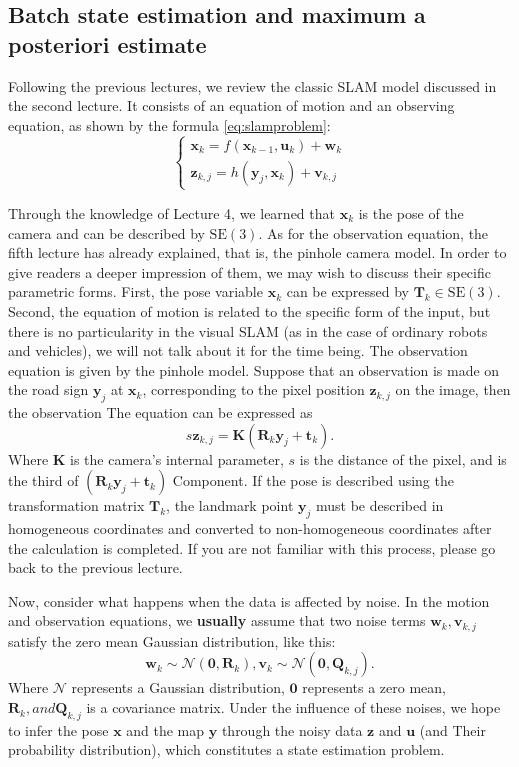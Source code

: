 \subsection{Batch state estimation and maximum a posteriori estimate}
Following the previous lectures, we review the classic SLAM model discussed in the second lecture. It consists of an equation of motion and an observing equation, as shown by the formula \eqref{eq:slamproblem}:
\begin{equation}
\left\{ \begin{array}{l}
{\bm{x}_k} = f\left( {{\bm{x}_{k - 1}},{\bm{u}_k}} \right) + \bm{w}_k\\
{\bm{z}_{k,j}} = h\left( {{ \bm{y}_j},{ \bm{x}_k}} \right)+ \bm{v}_{k, j}
\end{array} \right.
\end{equation}

Through the knowledge of Lecture 4, we learned that $\bm{x}_k$ is the pose of the camera and can be described by $\mathrm{SE}(3)$. As for the observation equation, the fifth lecture has already explained, that is, the pinhole camera model. In order to give readers a deeper impression of them, we may wish to discuss their specific parametric forms. First, the pose variable $\bm{x}_k$ can be expressed by $\bm{T}_k \in \mathrm{SE}(3) $. Second, the equation of motion is related to the specific form of the input, but there is no particularity in the visual SLAM (as in the case of ordinary robots and vehicles), we will not talk about it for the time being. The observation equation is given by the pinhole model. Suppose that an observation is made on the road sign $\bm{y}_j$ at $\bm{x}_k$, corresponding to the pixel position $\bm{z}_{k,j}$ on the image, then the observation The equation can be expressed as
\begin{equation}
s \bm{z}_{k,j}= \bm{K} (\bm{R}_k {\bm{y}_j}+\bm{t}_k).
\end{equation}
Where $\bm{K}$ is the camera's internal parameter, $s$ is the distance of the pixel, and is the third of $(\bm{R}_k {\bm{y}_j}+\bm{t}_k)$ Component. If the pose is described using the transformation matrix $\bm{T}_k$, the landmark point $\bm{y}_j$ must be described in homogeneous coordinates and converted to non-homogeneous coordinates after the calculation is completed. If you are not familiar with this process, please go back to the previous lecture.

Now, consider what happens when the data is affected by noise. In the motion and observation equations, we \textbf{usually} assume that two noise terms $\bm{w}_k, \bm{v}_{k,j}$ satisfy the zero mean Gaussian distribution, like this:
\begin{equation}
{\bm{w}_k} \sim \mathcal{N}\left( {\bm{0},{\bm{R}_k}} \right),{\bm{v}_k} \sim \mathcal {N}\left( {\bm{0},{{{\bm{Q}}}_{k,j}}} \right).
\end{equation}
Where $\mathcal{N}$ represents a Gaussian distribution, $\bm{0}$ represents a zero mean, $\bm{R}_k, and \bm{Q}_{k,j}$ is a covariance matrix. Under the influence of these noises, we hope to infer the pose $\bm{x}$ and the map $\bm{y}$ through the noisy data $\bm{z}$ and $\bm{u}$ (and Their probability distribution), which constitutes a state estimation problem.

